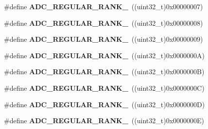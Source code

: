 \begin{DoxyCompactItemize}
\item 
\hypertarget{group___a_d_c__regular__rank_ga63bea206a722dd11460d09b619aa4145}{\#define {\bfseries A\-D\-C\-\_\-\-R\-E\-G\-U\-L\-A\-R\-\_\-\-R\-A\-N\-K\-\_}~((uint32\-\_\-t)0x00000007)}\label{group___a_d_c__regular__rank_ga63bea206a722dd11460d09b619aa4145}

\item 
\hypertarget{group___a_d_c__regular__rank_gab39e2e0fb73beec47d249a75a42b5293}{\#define {\bfseries A\-D\-C\-\_\-\-R\-E\-G\-U\-L\-A\-R\-\_\-\-R\-A\-N\-K\-\_}~((uint32\-\_\-t)0x00000008)}\label{group___a_d_c__regular__rank_gab39e2e0fb73beec47d249a75a42b5293}

\item 
\hypertarget{group___a_d_c__regular__rank_ga2df1ef58ff97a2a6946b4cc0978e9693}{\#define {\bfseries A\-D\-C\-\_\-\-R\-E\-G\-U\-L\-A\-R\-\_\-\-R\-A\-N\-K\-\_}~((uint32\-\_\-t)0x00000009)}\label{group___a_d_c__regular__rank_ga2df1ef58ff97a2a6946b4cc0978e9693}

\item 
\hypertarget{group___a_d_c__regular__rank_gad969d11913f157d860cc3e8ea81d2bcf}{\#define {\bfseries A\-D\-C\-\_\-\-R\-E\-G\-U\-L\-A\-R\-\_\-\-R\-A\-N\-K\-\_}~((uint32\-\_\-t)0x0000000\-A)}\label{group___a_d_c__regular__rank_gad969d11913f157d860cc3e8ea81d2bcf}

\item 
\hypertarget{group___a_d_c__regular__rank_gada79d07e1e30ef538ae3eb4d611d35a6}{\#define {\bfseries A\-D\-C\-\_\-\-R\-E\-G\-U\-L\-A\-R\-\_\-\-R\-A\-N\-K\-\_}~((uint32\-\_\-t)0x0000000\-B)}\label{group___a_d_c__regular__rank_gada79d07e1e30ef538ae3eb4d611d35a6}

\item 
\hypertarget{group___a_d_c__regular__rank_ga038fc7ee28205a62242e105ac4004931}{\#define {\bfseries A\-D\-C\-\_\-\-R\-E\-G\-U\-L\-A\-R\-\_\-\-R\-A\-N\-K\-\_}~((uint32\-\_\-t)0x0000000\-C)}\label{group___a_d_c__regular__rank_ga038fc7ee28205a62242e105ac4004931}

\item 
\hypertarget{group___a_d_c__regular__rank_gaf705597a827461af553a94766ca6e84b}{\#define {\bfseries A\-D\-C\-\_\-\-R\-E\-G\-U\-L\-A\-R\-\_\-\-R\-A\-N\-K\-\_}~((uint32\-\_\-t)0x0000000\-D)}\label{group___a_d_c__regular__rank_gaf705597a827461af553a94766ca6e84b}

\item 
\hypertarget{group___a_d_c__regular__rank_gab062685d9e3235869566d82891f5842b}{\#define {\bfseries A\-D\-C\-\_\-\-R\-E\-G\-U\-L\-A\-R\-\_\-\-R\-A\-N\-K\-\_}~((uint32\-\_\-t)0x0000000\-E)}\label{group___a_d_c__regular__rank_gab062685d9e3235869566d82891f5842b}


\end{DoxyCompactItemize}
